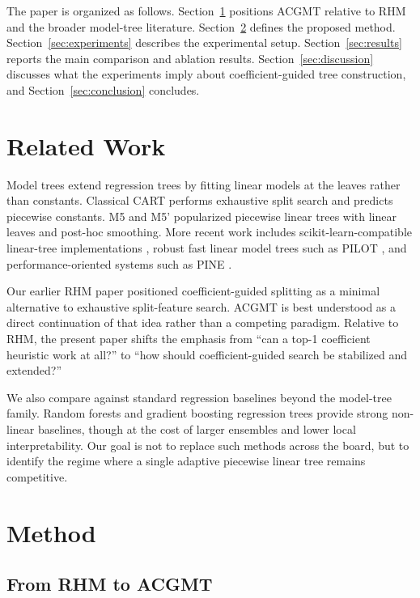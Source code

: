 \documentclass[11pt,a4paper]{article}
\begin{document}
The paper is organized as follows. Section~\ref{sec:related} positions ACGMT relative to RHM and the broader model-tree literature. Section~\ref{sec:method} defines the proposed method. Section~\ref{sec:experiments} describes the experimental setup. Section~\ref{sec:results} reports the main comparison and ablation results. Section~\ref{sec:discussion} discusses what the experiments imply about coefficient-guided tree construction, and Section~\ref{sec:conclusion} concludes.

\section{Related Work}\label{sec:related}

Model trees extend regression trees by fitting linear models at the leaves rather than constants. Classical CART \citep{breiman1984} performs exhaustive split search and predicts piecewise constants. M5 and M5' \citep{quinlan1992,wang1997} popularized piecewise linear trees with linear leaves and post-hoc smoothing. More recent work includes scikit-learn-compatible linear-tree implementations \citep{cerlymarco2021}, robust fast linear model trees such as PILOT \citep{raymaekers2024}, and performance-oriented systems such as PINE \citep{li2024}.

Our earlier RHM paper \citep{rhm2026} positioned coefficient-guided splitting as a minimal alternative to exhaustive split-feature search. ACGMT is best understood as a direct continuation of that idea rather than a competing paradigm. Relative to RHM, the present paper shifts the emphasis from ``can a top-1 coefficient heuristic work at all?'' to ``how should coefficient-guided search be stabilized and extended?''

We also compare against standard regression baselines beyond the model-tree family. Random forests \citep{breiman2001rf} and gradient boosting regression trees \citep{friedman2001gbm} provide strong non-linear baselines, though at the cost of larger ensembles and lower local interpretability. Our goal is not to replace such methods across the board, but to identify the regime where a single adaptive piecewise linear tree remains competitive.

\section{Method}\label{sec:method}

\subsection{From RHM to ACGMT}
\end{document}
